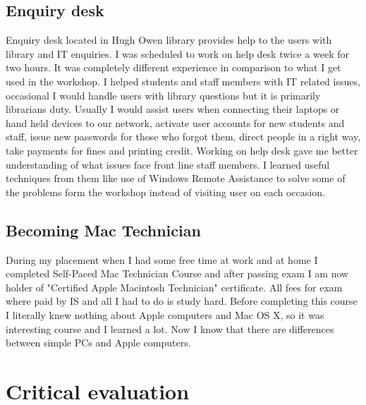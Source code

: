 \documentclass[10pt,a4paper,headinclude=true]{report}
\begin{document}
\section{Enquiry desk}
Enquiry desk located in Hugh Owen library provides help to the users with library and IT enquiries. I was scheduled to work on help desk twice a week for two hours. It was completely different experience in comparison to what I get used in the workshop. I helped students and staff members with IT related issues, occasional I would handle users with library  questions but it is primarily librarians duty. Usually I would assist users when connecting their laptops or hand held devices to our network, activate user accounts for new students and staff, issue new passwords for those who forgot them, direct people in a right way, take payments for fines and printing credit. Working on help desk gave me better understanding of what issues face front line staff members. I learned useful techniques from them like use of Windows Remote Assistance to solve some of the problems form the workshop instead of visiting user on each occasion.
  
\section{Becoming Mac Technician}
During my placement when I had some free time at work and at home I completed Self-Paced Mac Technician Course and after passing exam I am now holder of "Certified Apple Macintosh Technician" certificate. All fees for exam where paid by IS and all I had to do is study hard. Before completing this course I literally knew nothing about Apple computers and Mac OS X, so it was interesting course and I learned a lot. Now I know that there are differences between simple PCs and Apple computers. 
\chapter{Critical evaluation}



\end{document}
